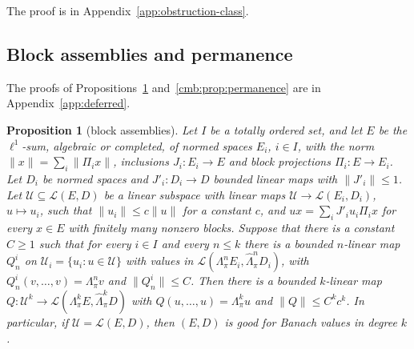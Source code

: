 \documentclass[11pt]{amsart}
\newtheorem{proposition}[theorem]{Proposition}
\theoremstyle{definition}
\theoremstyle{remark}
\numberwithin{equation}{section}
\newcommand{\cL}{\mathcal L}
\newcommand{\norm}[1]{\lVert #1\rVert}
\theoremstyle{plain}
\theoremstyle{definition}
\theoremstyle{plain}
\begin{document}
The proof is in Appendix~\ref{app:obstruction-class}.

\subsection{Block assemblies and permanence}\label{cmb:ssec:blocks}\label{cmb:ssec:permanence}

The proofs of Propositions~\ref{cmb:prop:blocks} and~\ref{cmb:prop:permanence} are in Appendix~\ref{app:deferred}.

\begin{proposition}[block assemblies]\label{cmb:prop:blocks}
Let $I$ be a totally ordered set, and let $E$ be the $\ell^1$-sum, algebraic or completed, of normed spaces $E_i$,
$i\in I$, with the norm $\norm x=\sum_i\norm{\Pi_ix}$, inclusions $J_i\colon E_i\to E$ and block projections
$\Pi_i\colon E\to E_i$. Let $D_i$ be normed spaces and $J'_i\colon D_i\to D$ bounded linear maps with $\norm{J'_i}\le1$.
Let $\mathcal U\subseteq\cL(E,D)$ be a linear subspace with linear maps $\mathcal U\to\cL(E_i,D_i)$, $u\mapsto u_i$, such
that $\norm{u_i}\le c\norm u$ for a constant $c$, and $ux=\sum_iJ'_iu_i\Pi_ix$ for every $x\in E$ with finitely many
nonzero blocks. Suppose that there is a constant $C\ge1$ such that for every $i\in I$ and every $n\le k$ there is a
bounded $n$-linear map $Q^i_n$ on $\mathcal U_i=\{u_i:u\in\mathcal U\}$ with values in
$\cL(\Lambda^n_\pi E_i,\widehat\Lambda^n_\pi D_i)$, with $Q^i_n(v,\dots,v)=\Lambda^n_\pi v$ and $\norm{Q^i_n}\le C$. Then
there is a bounded $k$-linear map $Q\colon\mathcal U^k\to\cL(\Lambda^k_\pi E,\widehat\Lambda^k_\pi D)$ with
$Q(u,\dots,u)=\Lambda^k_\pi u$ and $\norm Q\le C^kc^k$. In particular, if $\mathcal U=\cL(E,D)$, then $(E,D)$ is good for
Banach values in degree $k$.
\end{proposition}
\end{document}
